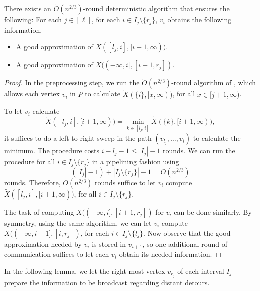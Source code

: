 \begin{lemma}
\label{lem:near}
There exists an $\widetilde{O}(n^{2/3})$-round deterministic algorithm that ensures the following: For each $j \in [\ell]$, for each $i \in I_j \setminus \{r_j\}$, $v_i$ obtains the following information.
\begin{itemize}
    \item A good approximation of $X([l_j, i], [i+1, \infty))$.
    \item A good approximation of $X((-\infty, i], [i+1, r_j])$.
\end{itemize}
\end{lemma}
\begin{proof}
In the preprocessing step, we run the $\widetilde{O}(n^{2/3})$-round algorithm of , which allows each vertex $v_i$ in $P$ to calculate $\widetilde{X}(\{i\}, [x, \infty))$, for all $x \in [j+1, \infty)$.

To let  $v_{i}$ calculate \[\widetilde{X}([l_j, i], [i+1, \infty)) = \min_{k \in [l_j, i]} \widetilde{X}(\{k\}, [i+1, \infty)),\] it suffices to do a left-to-right sweep in the path $(v_{l_j}, \ldots, v_{i})$ to calculate the minimum. The procedure costs $i-l_j-1\leq |I_j|-1$ rounds.  We can run the procedure for all $i \in I_j \setminus \{r_j\}$ in a pipelining fashion using \[(|I_j|-1) + |I_j \setminus \{r_j\}|- 1 = O(n^{2/3})\]
rounds. Therefore, $O(n^{2/3})$ rounds suffice to let $v_i$ compute $\widetilde{X}([l_j, i], [i+1, \infty))$, for all $i \in I_j \setminus \{r_j\}$.


The task of computing $X((-\infty, i], [i+1, r_j])$ for $v_i$ can be done similarly. By symmetry, using the same algorithm, we can let $v_i$ compute $X((-\infty, i-1], [i, r_j])$, for each $i \in I_j \setminus \{l_j\}$. Now observe that the good approximation needed by $v_i$ is stored in $v_{i+1}$, so one additional round of communication suffices to let each $v_i$ obtain its needed information. 
\end{proof}


In the following lemma, we let the right-most vertex $v_{r_j}$ of each interval $I_j$ prepare the information to be broadcast regarding distant detours.

